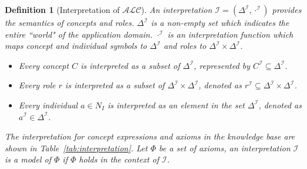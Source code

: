 \documentclass{article}
\newtheorem{mydef}{Definition}
\begin{document}
\begin{mydef}[Interpretation of $\mathcal{ALC}$]
An interpretation $\mathcal{I}=(\Delta^\mathcal{I},\cdot^\mathcal{I})$ provides the semantics of concepts and roles. $\Delta^\mathcal{I}$ is a non-empty set which indicates the entire
``world" of the application domain. $\cdot^\mathcal{I}$ is an interpretation function which maps concept and individual symbols to $\Delta^\mathcal{I}$ and roles to $\Delta^\mathcal{I} \times \Delta^\mathcal{I}$.
\begin{itemize}
 \item Every concept $C$ is interpreted as a subset of $\Delta^\mathcal{I}$, represented by $C^\mathcal{I}\subseteq \Delta^\mathcal{I}$.
 \item Every  role $r$ is interpreted as a subset of $\Delta^\mathcal{I}\times\Delta^\mathcal{I}$, denoted as $r^\mathcal{I}\subseteq \Delta^\mathcal{I}\times\Delta^\mathcal{I}$.
 \item Every individual $a \in N_I$ is interpreted as an element in the set $\Delta^\mathcal{I}$, denoted as $a^\mathcal{I} \in \Delta^\mathcal{I}$.
\end{itemize}
The interpretation for concept expressions and axioms in the knowledge base are shown in Table~\ref{tab:interpretation}.
Let $\varPhi$ be a set of axioms, an interpretation $\mathcal{I}$ is a \textit{model} of $\varPhi$ if $\varPhi$ holds in the context of $\mathcal{I}$.
\end{mydef}
\end{document}
